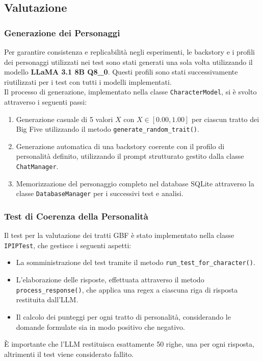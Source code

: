 \clearpage

\subsection{Valutazione}

\subsubsection{Generazione dei Personaggi}

Per garantire consistenza e replicabilità negli esperimenti, le backstory e i profili dei personaggi utilizzati nei test sono stati generati una sola volta utilizzando il modello \textbf{LLaMA 3.1 8B Q8\_0}. Questi profili sono stati successivamente riutilizzati per i test con tutti i modelli implementati.\\
Il processo di generazione, implementato nella classe \texttt{CharacterModel}, si è svolto attraverso i seguenti passi:

\begin{enumerate}
    \item Generazione casuale di 5 valori $X$ con $X \in [0.00, 1.00]$ per ciascun tratto dei Big Five utilizzando il metodo \texttt{generate\_random\_trait()}.
    \item Generazione automatica di una backstory coerente con il profilo di personalità definito, utilizzando il prompt strutturato gestito dalla classe \texttt{ChatManager}.
    \item Memorizzazione del personaggio completo nel database SQLite attraverso la classe \texttt{DatabaseManager} per i successivi test e analisi.
\end{enumerate}

\subsubsection{Test di Coerenza della Personalità}

Il test per la valutazione dei tratti GBF è stato implementato nella classe \texttt{IPIPTest}, che gestisce i seguenti aspetti:

\begin{itemize}
    \item 
    La somministrazione del test tramite il metodo \texttt{run\_test\_for\_character()}. 
    \item 
    L'elaborazione delle risposte, effettuata attraverso il metodo \texttt{process\_response()}, che applica una regex a ciascuna riga di risposta restituita dall'LLM. 
    \item
    Il calcolo dei punteggi per ogni tratto di personalità, considerando le domande formulate sia in modo positivo che negativo.
\end{itemize}
È importante che l'LLM restituisca esattamente 50 righe, una per ogni risposta, altrimenti il test viene considerato fallito.

